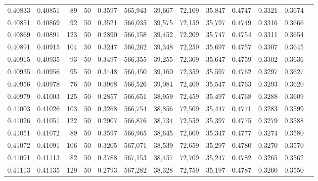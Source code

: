 \begin{tabular}{rrrrrrrrrrrrr}
0.40833 & 0.40851 &    89 &  50 &                                     0.3597 & 565,943 &  39,667 &  72,109 &  35,847 & 0.4747 & 0.3321 & 0.3674 \\
0.40851 & 0.40869 &    92 &  50 &                                     0.3521 & 566,035 &  39,575 &  72,159 &  35,797 & 0.4749 & 0.3316 & 0.3666 \\
0.40869 & 0.40891 &   123 &  50 &                                     0.2890 & 566,158 &  39,452 &  72,209 &  35,747 & 0.4754 & 0.3311 & 0.3654 \\
0.40891 & 0.40915 &   104 &  50 &                                     0.3247 & 566,262 &  39,348 &  72,259 &  35,697 & 0.4757 & 0.3307 & 0.3645 \\
0.40915 & 0.40935 &    93 &  50 &                                     0.3497 & 566,355 &  39,255 &  72,309 &  35,647 & 0.4759 & 0.3302 & 0.3636 \\
0.40935 & 0.40956 &    95 &  50 &                                     0.3448 & 566,450 &  39,160 &  72,359 &  35,597 & 0.4762 & 0.3297 & 0.3627 \\
0.40956 & 0.40978 &    76 &  50 &                                     0.3968 & 566,526 &  39,084 &  72,409 &  35,547 & 0.4763 & 0.3293 & 0.3620 \\
0.40979 & 0.41003 &   125 &  50 &                                     0.2857 & 566,651 &  38,959 &  72,459 &  35,497 & 0.4768 & 0.3288 & 0.3609 \\
0.41003 & 0.41026 &   103 &  50 &                                     0.3268 & 566,754 &  38,856 &  72,509 &  35,447 & 0.4771 & 0.3283 & 0.3599 \\
0.41026 & 0.41051 &   122 &  50 &                                     0.2907 & 566,876 &  38,734 &  72,559 &  35,397 & 0.4775 & 0.3279 & 0.3588 \\
0.41051 & 0.41072 &    89 &  50 &                                     0.3597 & 566,965 &  38,645 &  72,609 &  35,347 & 0.4777 & 0.3274 & 0.3580 \\
0.41072 & 0.41091 &   106 &  50 &                                     0.3205 & 567,071 &  38,539 &  72,659 &  35,297 & 0.4780 & 0.3270 & 0.3570 \\
0.41091 & 0.41113 &    82 &  50 &                                     0.3788 & 567,153 &  38,457 &  72,709 &  35,247 & 0.4782 & 0.3265 & 0.3562 \\
0.41113 & 0.41135 &   129 &  50 &                                     0.2793 & 567,282 &  38,328 &  72,759 &  35,197 & 0.4787 & 0.3260 & 0.3550 \\

\end{tabular}
